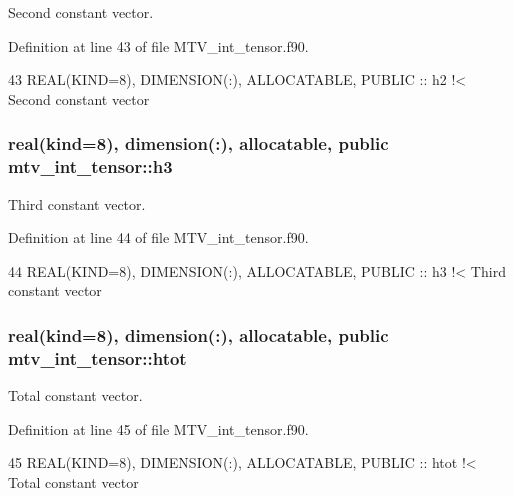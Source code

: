 Second constant vector. 



Definition at line 43 of file M\+T\+V\+\_\+int\+\_\+tensor.\+f90.


\begin{DoxyCode}
43   \textcolor{keywordtype}{REAL(KIND=8)}, \textcolor{keywordtype}{DIMENSION(:)}, \textcolor{keywordtype}{ALLOCATABLE}, \textcolor{keywordtype}{PUBLIC} :: h2\textcolor{comment}{   !< Second constant vector}
\end{DoxyCode}
\subsubsection[{\texorpdfstring{h3}{h3}}]{\setlength{\rightskip}{0pt plus 5cm}real(kind=8), dimension(\+:), allocatable, public mtv\+\_\+int\+\_\+tensor\+::h3}\hypertarget{namespacemtv__int__tensor_a596c16bed479b011818d66810e590bae}{}\label{namespacemtv__int__tensor_a596c16bed479b011818d66810e590bae}


Third constant vector. 



Definition at line 44 of file M\+T\+V\+\_\+int\+\_\+tensor.\+f90.


\begin{DoxyCode}
44   \textcolor{keywordtype}{REAL(KIND=8)}, \textcolor{keywordtype}{DIMENSION(:)}, \textcolor{keywordtype}{ALLOCATABLE}, \textcolor{keywordtype}{PUBLIC} :: h3\textcolor{comment}{   !< Third constant vector}
\end{DoxyCode}
\subsubsection[{\texorpdfstring{htot}{htot}}]{\setlength{\rightskip}{0pt plus 5cm}real(kind=8), dimension(\+:), allocatable, public mtv\+\_\+int\+\_\+tensor\+::htot}\hypertarget{namespacemtv__int__tensor_aa82b34ace4bb21fbfc0e37ccc3db4815}{}\label{namespacemtv__int__tensor_aa82b34ace4bb21fbfc0e37ccc3db4815}


Total constant vector. 



Definition at line 45 of file M\+T\+V\+\_\+int\+\_\+tensor.\+f90.


\begin{DoxyCode}
45   \textcolor{keywordtype}{REAL(KIND=8)}, \textcolor{keywordtype}{DIMENSION(:)}, \textcolor{keywordtype}{ALLOCATABLE}, \textcolor{keywordtype}{PUBLIC} :: htot\textcolor{comment}{ !< Total constant vector}
\end{DoxyCode}
